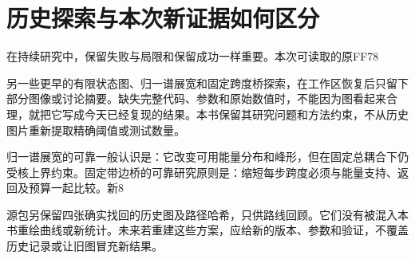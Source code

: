 \documentclass[11pt,a4paper]{article}
\begin{document}
\section{{\cjkfont 历史探索与本次新证据如何区分}\allowbreak{}}\label{sec:53}
{\cjkfont 在持续研究中，保留失败与局限和保留成功一样重要。本次可读取的原}\allowbreak{}FF78\allowbreak{}
\par
{\cjkfont 另一些更早的有限状态图、归一谱展宽和固定跨度桥探索，在工作区恢复后只留下部分图像或讨论摘要。缺失完整代码、参数和原始数值时，不能因为图看起来合理，就把它写成今天已经复现的结果。本书保留其研究问题和方法约束，不从历史图片重新提取精确阈值或测试数量。}\allowbreak{}
\par
{\cjkfont 归一谱展宽的可靠一般认识是：它改变可用能量分布和峰形，但在固定总耦合下仍受核上界约束。固定带边桥的可靠研究原则是：缩短每步跨度必须与能量支持、返回及预算一起比较。新}\allowbreak{}8\allowbreak{}
\par
{\cjkfont 源包另保留四张确实找回的历史图及路径哈希，只供路线回顾。它们没有被混入本书重绘曲线或新统计。未来若重建这些方案，应给新的版本、参数和验证，不覆盖历史记录或让旧图冒充新结果。}\allowbreak{}
\par
{}
\medskip
\FloatBarrier
\Needspace{110pt}
\end{document}
